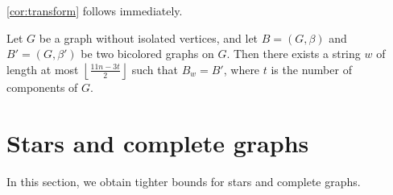 \documentclass[runningheads,orivec]{llncs}
\begin{document}
\autoref{cor:transform} follows immediately.

\begin{corollary}
    \label{cor:transform}
    Let $G$ be a graph without isolated vertices, and let $B = (G, \beta)$ and $B' = (G, \beta')$ be two bicolored graphs on $G$. 
    Then there exists a string $w$ of length at most $\left \lfloor \tfrac{11n-3t}{2}\right \rfloor$ such that $B_w = B'$, where $t$ is the number of components of $G$.
\end{corollary}

\section{Stars and complete graphs}\label{Section_4}
In this section, we obtain tighter bounds for stars and complete graphs.
\end{document}
